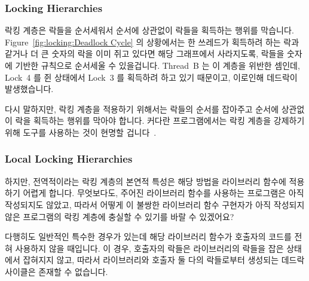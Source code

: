 \subsubsection{Locking Hierarchies}
\label{sec:locking:Locking Hierarchies}

락킹 계층은 락들을 순서세워서 순서에 상관없이 락들을 획득하는 행위를 막습니다.
Figure~\ref{fig:locking:Deadlock Cycle} 의 상황에서는 한 쓰레드가 획득하려 하는
락과 같거나 더 큰 숫자의 락을 이미 쥐고 있다면 해당 그래프에서 사라지도록,
락들을 숫자에 기반한 규칙으로 순서세울 수 있을겁니다.
Thread~B 는 이 계층을 위반한 셈인데, Lock~4 를 쥔 상태에서 Lock~3 를 획득하려
하고 있기 때문이고, 이로인해 데드락이 발생했습니다.

다시 말하지만, 락킹 계층을 적용하기 위해서는 락들의 순서를 잡아주고 순서에
상관없이 락을 획득하는 행위를 막아야 합니다.
커다란 프로그램에서는 락킹 계층을 강제하기 위해 도구를 사용하는 것이 현명할
겁니다~\cite{JonathanCorbet2006lockdep}.

\subsubsection{Local Locking Hierarchies}
\label{sec:locking:Local Locking Hierarchies}

하지만, 전역적이라는 락킹 계층의 본연적 특성은 해당 방법을 라이브러리 함수에
적용하기 어렵게 합니다.
무엇보다도, 주어진 라이브러리 함수를 사용하는 프로그램은 아직 작성되지도
않았고, 따라서 어떻게 이 불쌍한 라이브러리 함수 구현자가 아직 작성되지 않은
프로그램의 락킹 계층에 충실할 수 있기를 바랄 수 있겠어요?

다행히도 일반적인 특수한 경우가 있는데 해당 라이브러리 함수가 호출자의 코드를
전혀 사용하지 않을 때입니다.
이 경우, 호출자의 락들은 라이브러리의 락들을 잡은 상태에서 잡혀지지 않고,
따라서 라이브러리와 호출자 둘 다의 락들로부터 생성되는 데드락 사이클은 존재할
수 없습니다.
\iffalse

